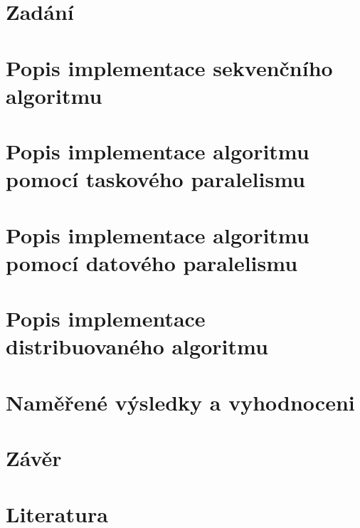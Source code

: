 

\section{Zadání}


\section{Popis implementace sekvenčního algoritmu}


\section{Popis implementace algoritmu pomocí taskového paralelismu}


\clearpage
\section{Popis implementace algoritmu pomocí datového paralelismu}


\section{Popis implementace distribuovaného algoritmu}


\section{Naměřené výsledky a vyhodnoceni}


\section{Závěr}


\section{Literatura}



